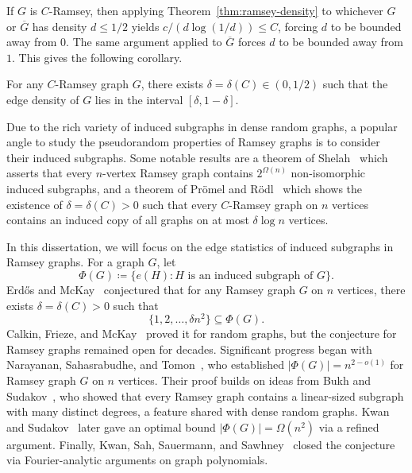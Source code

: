 If $G$ is $C$-Ramsey, then applying Theorem~\ref{thm:ramsey-density} to whichever $G$ or $\overline{G}$ has density $d \leq 1/2$ yields $c/(d\log(1/d)) \leq C$, forcing $d$ to be bounded away from $0$. The same argument applied to $\overline{G}$ forces $d$ to be bounded away from $1$. This gives the following corollary.

\begin{corollary}
  \label{cor:ramsey-density}
  For any $C$-Ramsey graph $G$, there exists $\delta = \delta(C) \in (0, 1/2)$ such that the edge density of $G$ lies in the interval $[\delta, 1-\delta]$.
\end{corollary}

Due to the rich variety of induced subgraphs in dense random graphs, a popular angle to study the pseudorandom properties of Ramsey graphs is to consider their induced subgraphs. Some notable results are a theorem of Shelah~\cite{shelah1997erdhosrenyiconjecture} which asserts that every $n$-vertex Ramsey graph contains $2^{\Omega(n)}$ non-isomorphic induced subgraphs, and a theorem of Pr\"{o}mel and R\"{o}dl~\cite{PROMEL1999379} which shows the existence of $\delta = \delta(C) > 0$ such that every $C$-Ramsey graph on $n$ vertices contains an induced copy of all graphs on at most $\delta \log n$ vertices. 

In this dissertation, we will focus on the edge statistics of induced subgraphs in Ramsey graphs. For a graph $G$, let 
\[
  \Phi(G) \coloneqq \bigl\{e(H) : H \text{ is an induced subgraph of } G\bigr\}.
\]
Erd\H{o}s and McKay~\cite{EFS} conjectured that for any Ramsey graph $G$ on $n$ vertices, there exists $\delta = \delta(C) > 0$ such that
\[
  \bigl\{1, 2, \ldots, \delta n^2\bigr\} \subseteq \Phi(G).
\]
Calkin, Frieze, and McKay~\cite{erdosmckayrandomgraph} proved it for random graphs, but the conjecture for Ramsey graphs remained open for decades. Significant progress began with Narayanan, Sahasrabudhe, and Tomon~\cite{narayanan2017ramseygraphsinducesubgraphs}, who established $|\Phi(G)| = n^{2 - o(1)}$ for Ramsey graph $G$ on $n$ vertices. Their proof builds on ideas from Bukh and Sudakov~\cite{BUKH2007612}, who showed that every Ramsey graph contains a linear-sized subgraph with many distinct degrees, a feature shared with dense random graphs. Kwan and Sudakov~\cite{kwan2021ramseygraphsinducesubgraphs} later gave an optimal bound $|\Phi(G)| = \Omega(n^2)$ via a refined argument. Finally, Kwan, Sah, Sauermann, and Sawhney~\cite{Kwan_2023} closed the conjecture via Fourier-analytic arguments on graph polynomials.

